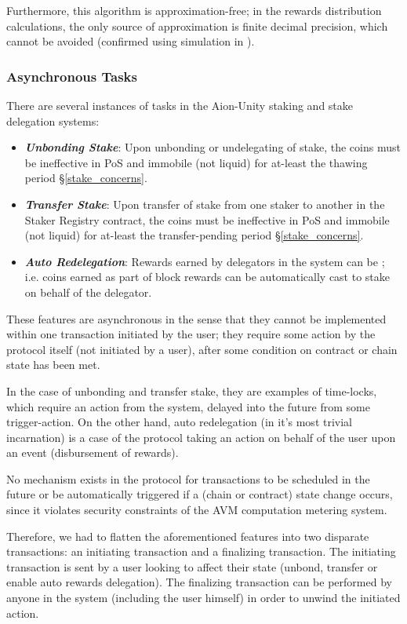 Furthermore, this algorithm is approximation-free; in the rewards distribution calculations, the only source of approximation is finite decimal precision, which cannot be avoided (confirmed using simulation in \cite{Sha19}).  

\subsubsection{Asynchronous Tasks}
There are several instances of  tasks in the Aion-Unity staking and stake delegation systems: 
\begin{itemize}
    \item \textit{\textbf{Unbonding Stake}}: Upon unbonding or undelegating of stake, the coins must be ineffective in PoS and immobile (not liquid) for at-least the thawing period \S\ref{stake_concerns}.  
    \item \textit{\textbf{Transfer Stake}}: Upon transfer of stake from one staker to another in the Staker Registry contract, the coins must be ineffective in PoS and immobile (not liquid) for at-least the transfer-pending period \S\ref{stake_concerns}.  
    \item \textit{\textbf{Auto Redelegation}}: Rewards earned by delegators in the system can be ; i.e. coins earned as part of block rewards can be automatically cast to stake on behalf of the delegator.  
\end{itemize}

These features are asynchronous in the sense that they cannot be implemented within one transaction initiated by the user; they require some action by the protocol itself (not initiated by a user), after some condition on contract or chain state has been met.   

In the case of unbonding and transfer stake, they are examples of time-locks, which require an action from the system, delayed into the future from some trigger-action. On the other hand, auto redelegation (in it's most trivial incarnation) is a case of the protocol taking an action on behalf of the user upon an event (disbursement of rewards). 

No mechanism exists in the protocol for transactions to be scheduled in the future or be automatically triggered if a (chain or contract) state change occurs, since it violates security constraints of the AVM computation metering system. 

Therefore, we had to flatten the aforementioned features into two disparate transactions: an initiating transaction and a finalizing transaction. The initiating transaction is sent by a user looking to affect their state (unbond, transfer or enable auto rewards delegation). The finalizing transaction can be performed by anyone in the system (including the user himself) in order to unwind the initiated action.

